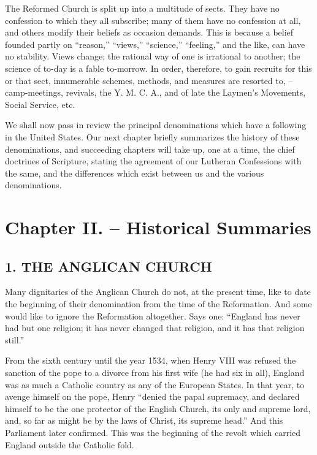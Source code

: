 \documentclass[
]{book}
\def\igobble#1{}
\begin{document}
The Reformed Church is split up into a multitude of sects. They have no confession to which they all subscribe; many of them have no confession at all, and others modify their beliefs as occasion demands. This is because a belief founded partly on ``reason,'' ``views,'' ``science,'' ``feeling,'' and the like, can have no stability. Views change; the rational way of one is irrational to another; the science of to-day is a fable to-morrow. In order, therefore, to gain recruits for this or that sect, innumerable schemes, methods, and measures are resorted to, -- camp-meetings, revivals, the Y. M. C. A., and of late the Laymen's Movements, Social Service, etc.

We shall now pass in review the principal denominations which have a following in the United States. Our next chapter briefly summarizes the history of these denominations, and succeeding chapters will take up, one at a time, the chief doctrines of Scripture, stating the agreement of our Lutheran Confessions with the same, and the differences which exist between us and the various denominations.

\hypertarget{chapter-ii.-historical-summaries}{%
\section*{Chapter II. -- Historical Summaries}\label{chapter-ii.-historical-summaries}}

\hypertarget{the-anglican-church}{%
\subsection*{1. THE ANGLICAN CHURCH}\label{the-anglican-church}}

Many dignitaries of the Anglican\index{Anglican Church!zzzzz@\igobble|seealso{Episcopal Church}} Church do not, at the present time, like to date the beginning of their denomination from the time of the Reformation. And some would like to ignore the Reformation altogether. Says one: ``England has never had but one religion; it has never changed that religion, and it has that religion still.''

From the sixth century until the year 1534, when Henry VIII was refused the sanction of the pope to a divorce from his first wife (he had six in all), England was as much a Catholic country as any of the European States. In that year, to avenge himself on the pope, Henry ``denied the papal supremacy, and declared himself to be the one protector of the English Church, its only and supreme lord, and, so far as might be by the laws of Christ, its supreme head.'' And this Parliament later confirmed. This was the beginning of the revolt which carried England outside the Catholic fold.
\end{document}
